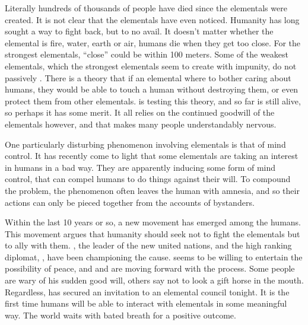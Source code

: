 \documentclass[blue]{elementals}
\begin{document}

Literally hundreds of thousands of people have died since the elementals were created. It is not clear that the elementals have even noticed. Humanity has long sought a way to fight back, but to no avail. It doesn't matter whether the elemental is fire, water, earth or air, humans die when they get too close. For the strongest elementals, ``close'' could be within 100 meters. Some of the weakest elementals, which the strongest elementals seem to create with impunity, do not passively . There is a theory that if an elemental where to bother caring about humans, they would be able to touch a human without destroying them, or even protect them from other elementals. \cDiplomat{} is testing this theory, and so far is still alive, so perhaps it has some merit. It all relies on the continued goodwill of the elementals however, and that makes many people understandably nervous.

One particularly disturbing phenomenon involving elementals is that of mind control. It has recently come to light that some elementals are taking an interest in humans in a bad way. They are apparently inducing some form of mind control, that can compel humans to do things against their will. To compound the problem, the phenomenon often leaves the human with amnesia, and so their actions can only be pieced together from the accounts of bystanders.

Within the last 10 years or so, a new movement has emerged among the humans. This movement argues that humanity should seek not to fight the elementals but to ally with them. \cLeader{}, the leader of the new united nations, and the high ranking diplomat, \cAvatar{}, have been championing the cause. \cAirKing{} seems to be willing to entertain the possibility of peace, and \cLeader{} and \cAvatar{} are moving forward with the process. Some people are wary of his sudden good will, others say not to look a gift horse in the mouth. Regardless, \cLeader{} has secured an invitation to an elemental council tonight. It is the first time humans will be able to interact with elementals in some meaningful way. The world waits with bated breath for a positive outcome.

\end{document}
